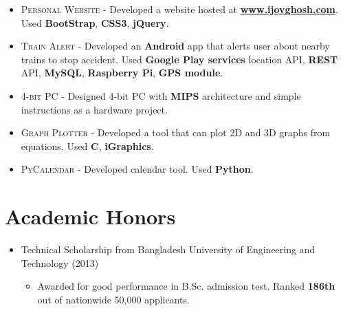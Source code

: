 \documentclass[a4paper,10pt]{article}
\begin{document}
\begin{itemize}
    \item \textsc{Personal Website} - 
        Developed a website hosted at \href{http://www.ijoyghosh.com}{\textbf{www.ijoyghosh.com}}.
        Used \textbf{BootStrap}, \textbf{CSS3}, \textbf{jQuery}.
    
    \item \textsc{Train Alert} - 
        Developed an \textbf{Android} app that alerts user about nearby trains to stop accident.
        Used \textbf{Google Play services} location API, \textbf{REST} API, \textbf{MySQL}, \textbf{Raspberry Pi}, \textbf{GPS module}.
    
   \item \textsc{4-bit PC} -  
       Designed 4-bit PC with \textbf{MIPS} architecture and  simple instructions as a hardware project.
   
   \item \textsc{Graph Plotter} - 
       Developed a tool that can plot \textsc{2D} and \textsc{3D} graphs from equations.
       Used \textbf{C}, \textbf{iGraphics}.
   
   \item \textsc{PyCalendar} - 
       Developed calendar tool. 
       Used \textbf{Python}.

\end{itemize}



\section{Academic Honors}
\begin{itemize}
    \item 
    Technical Scholarship from Bangladesh University of Engineering and Technology (2013)
    \begin{itemize}
        \item Awarded for good performance in B.Sc. admission test. Ranked \textbf{186th} out of nationwide 50,000 applicants.
    \end{itemize}
\end{itemize}
\end{document}
